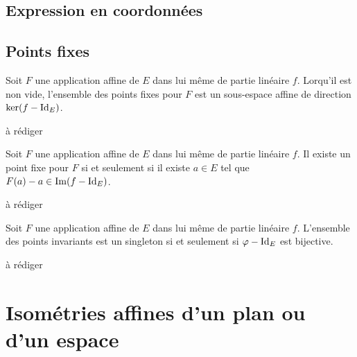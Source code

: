 \subsection{Expression en coordonnées}
\subsection{Points fixes}
\begin{prop}
 Soit $F$ une application affine de $E$ dans lui même de partie linéaire $f$. Lorqu'il est non vide, l'ensemble des points fixes pour $F$ est un sous-espace affine de direction $\ker(f-\mathop{\mathrm{Id}}_E)$. 
\end{prop}
\begin{demo}
 à rédiger
\end{demo}
\begin{prop}
 Soit $F$ une application affine de $E$ dans lui même de partie linéaire $f$. Il existe un point fixe pour $F$ si et seulement si il existe $a\in E$ tel que $F(a)-a\in \mathop{\mathrm{Im}}(f-\mathop{\mathrm{Id}}_E)$.
\end{prop}
\begin{demo}
 à rédiger
\end{demo}
\begin{prop}
 Soit $F$ une application affine de $E$ dans lui même de partie linéaire $f$. L'ensemble des points invariants est un singleton si et seulement si $\varphi -\mathop{\mathrm{Id}}_E$ est bijective.
\end{prop}
\begin{demo}
 à rédiger
\end{demo}

\section{Isométries affines d'un plan ou d'un espace}
